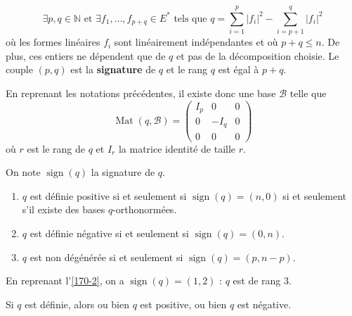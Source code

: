 	\begin{theorem}
		\[ \exists p, q \in \mathbb{N} \text{ et } \exists f_1, \dots, f_{p+q} \in E^* \text{ tels que } q = \sum_{i=1}^p |f_i|^2 - \sum_{i=p+1}^q |f_i|^2 \]
		où les formes linéaires $f_i$ sont linéairement indépendantes et où $p + q \leq n$. De plus, ces entiers ne dépendent que de $q$ et pas de la décomposition choisie.
		\newpar
		Le couple $(p,q)$ est la \textbf{signature} de $q$ et le rang $q$ est égal à $p+q$.
	\end{theorem}

	\begin{remark}
		En reprenant les notations précédentes, il existe donc une base $\mathcal{B}$ telle que
		\[
		\operatorname{Mat}(q, \mathcal{B}) =
		\begin{pmatrix}
			I_p & 0 & 0 \\
			0 & -I_q & 0 \\
			0 & 0 & 0
		\end{pmatrix}
		\]
		où $r$ est le rang de $q$ et $I_r$ la matrice identité de taille $r$.
	\end{remark}


	\begin{corollary}
		On note $\operatorname{sign}(q)$ la signature de $q$.
		\begin{enumerate}[label=(\roman*)]
			\item $q$ est définie positive si et seulement si $\operatorname{sign}(q) = (n, 0)$ si et seulement s'il existe des bases $q$-orthonormées.
			\item $q$ est définie négative si et seulement si $\operatorname{sign}(q) = (0, n)$.
			\item $q$ est non dégénérée si et seulement si $\operatorname{sign}(q) = (p, n-p)$.
		\end{enumerate}
	\end{corollary}


	\begin{example}
		En reprenant l'\cref{170-2}, on a $\operatorname{sign}(q) = (1,2)$ : $q$ est de rang $3$.
	\end{example}

	\begin{proposition}
		Si $q$ est définie, alors ou bien $q$ est positive, ou bien $q$ est négative.
	\end{proposition}

